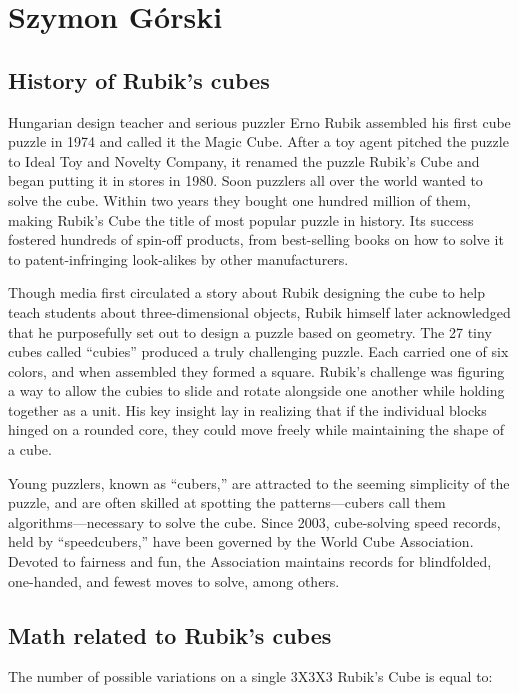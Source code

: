 \section{Szymon Górski}
\label{sec::sggorski}

\subsection{History of Rubik's cubes}

\hspace{2cm} Hungarian design teacher and serious puzzler Erno Rubik assembled his first cube puzzle in 1974 and called it the Magic Cube. After a toy agent pitched the puzzle to Ideal Toy and Novelty Company, it renamed the puzzle Rubik’s Cube and began putting it in stores in 1980. Soon puzzlers all over the world wanted to solve the cube. Within two years they bought one hundred million of them, making Rubik’s Cube the title of most popular puzzle in history. Its success fostered hundreds of spin-off products, from best-selling books on how to solve it to patent-infringing look-alikes by other manufacturers.


\hspace{2cm}Though media first circulated a story about Rubik designing the cube to help teach students about three-dimensional objects, Rubik himself later acknowledged that he purposefully set out to design a puzzle based on geometry. The 27 tiny cubes called “cubies” produced a truly challenging puzzle. Each carried one of six colors, and when assembled they formed a square. Rubik’s challenge was figuring a way to allow the cubies to slide and rotate alongside one another while holding together as a unit. His key insight lay in realizing that if the individual blocks hinged on a rounded core, they could move freely while maintaining the shape of a cube.


\hspace{2cm}Young puzzlers, known as “cubers,” are attracted to the seeming simplicity of the puzzle, and are often skilled at spotting  the patterns—cubers call them algorithms—necessary to solve the cube. Since 2003, cube-solving speed records, held by “speedcubers,” have been governed by the World Cube Association. Devoted to fairness and fun, the Association maintains records for blindfolded, one-handed, and fewest moves to solve, among others. 

\subsection{Math related to Rubik's cubes}
The number of possible variations on a single 3X3X3 Rubik's Cube is equal to:

